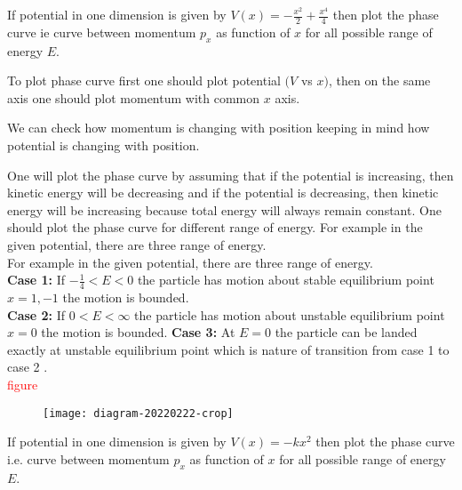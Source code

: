 \begin{example}
	If potential in one dimension is given by $V(x)=-\frac{x^{2}}{2}+\frac{x^{4}}{4}$ then plot the phase curve ie curve between momentum $p_{x}$ as function of $x$ for all possible range of energy $E$.
\end{example}
\begin{answer}
	To plot phase curve first one should plot potential $(V$ vs $x)$, then on the same axis one should plot momentum with common $x$ axis.
	
	We can check how momentum is changing with position keeping in mind how potential is changing with position.
	
	One will plot the phase curve by assuming that if the potential is increasing, then kinetic energy will be decreasing and if the potential is decreasing, then kinetic energy will be increasing because total energy will always remain constant. One should plot the phase curve for different range of energy.
	For example in the given potential, there are three range of energy.\\
	For example in the given potential, there are three range of energy.\\ 
	\textbf{Case 1:}  If $-\frac{1}{4}<E<0$ the particle has motion about stable equilibrium point $x=1,-1$ the motion is bounded.\\
	\textbf{Case 2:} If $0<E<\infty$ the particle has motion about unstable equilibrium point $x=0$ the motion is bounded.
	\textbf{Case 3:} At $E=0$ the particle can be landed exactly at unstable equilibrium point which is nature of transition from case 1 to case 2 .\\
	\textcolor{red}{figure}
	\begin{figure}[H]
		\centering
		\texttt{[image: diagram-20220222-crop]}
	\end{figure}
\end{answer}
\begin{example}
	If potential in one dimension is given by $V(x)=-k x^{2}$ then plot the phase curve i.e. curve between momentum $p_{x}$ as function of $x$ for all possible range of energy $E$.
\end{example}
